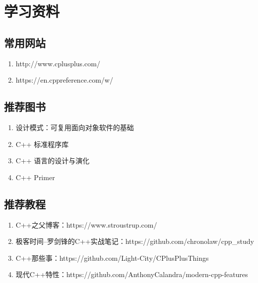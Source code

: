 \chapter{学习资料}

\section{常用网站}

\begin{enumerate}
  \item http://www.cplusplus.com/
  \item https://en.cppreference.com/w/
\end{enumerate}

\section{推荐图书}

\begin{enumerate}
  \item 设计模式：可复用面向对象软件的基础
  \item C++ 标准程序库
  \item C++ 语言的设计与演化
  \item C++ Primer
\end{enumerate}

\section{推荐教程}

\begin{enumerate}
  \item C++之父博客：https://www.stroustrup.com/
  \item 极客时间--罗剑锋的C++实战笔记：https://github.com/chronolaw/cpp\_study
  \item C++那些事：https://github.com/Light-City/CPlusPlusThings
  \item 现代C++特性：https://github.com/AnthonyCalandra/modern-cpp-features
\end{enumerate}

